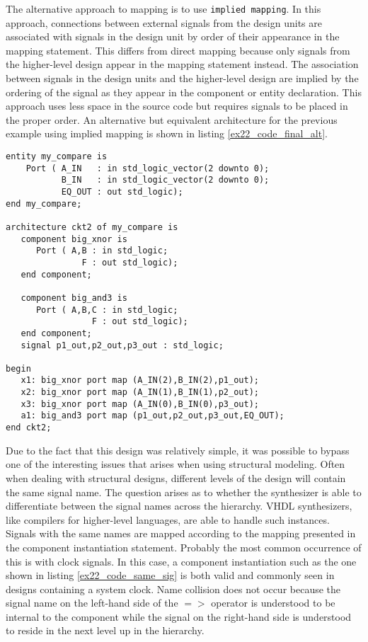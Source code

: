 The alternative approach to mapping is to use \texttt{implied mapping}. In this approach, connections between external signals from the design units are associated with signals in the design unit by order of their appearance in the mapping statement. This differs from direct mapping because only signals from the higher-level design appear in the mapping statement instead. The association between signals in the design units and the higher-level design are implied by the ordering of the signal as they appear in the component or entity declaration. This approach uses less space in the source code but requires signals to be placed in the proper order. An alternative but equivalent architecture for the previous example using implied mapping is shown in listing \ref{ex22_code_final_alt}. 

\begin{lstlisting}[label=ex22_code_final_alt, caption=Alternative architecture for Example 22 using implied mapping.]
entity my_compare is
    Port ( A_IN   : in std_logic_vector(2 downto 0);
           B_IN   : in std_logic_vector(2 downto 0);
           EQ_OUT : out std_logic);
end my_compare;

architecture ckt2 of my_compare is 
   component big_xnor is
      Port ( A,B : in std_logic;
               F : out std_logic);
   end component;

   component big_and3 is
      Port ( A,B,C : in std_logic;
                 F : out std_logic);
   end component;
   signal p1_out,p2_out,p3_out : std_logic; 

begin
   x1: big_xnor port map (A_IN(2),B_IN(2),p1_out); 
   x2: big_xnor port map (A_IN(1),B_IN(1),p2_out); 
   x3: big_xnor port map (A_IN(0),B_IN(0),p3_out);   
   a1: big_and3 port map (p1_out,p2_out,p3_out,EQ_OUT); 
end ckt2;
\end{lstlisting}

Due to the fact that this design was relatively simple, it was possible to bypass one of the interesting issues that arises when using structural modeling. Often when dealing with structural designs, different levels of the design will contain the same signal name. The question arises as to whether the synthesizer is able to differentiate between the signal names across the hierarchy. VHDL synthesizers, like compilers for higher-level languages, are able to handle such instances. Signals with the same names are mapped according to the mapping presented in the component instantiation statement. Probably the most common occurrence of this is with clock signals. In this case, a component instantiation such as the one shown in listing \ref{ex22_code_same_sig} is both valid and commonly seen in designs containing a system clock. Name collision does not occur because the signal name on the left-hand side of the $=>$ operator is understood to be internal to the component while the signal on the right-hand side is understood to reside in the next level up in the hierarchy.  

